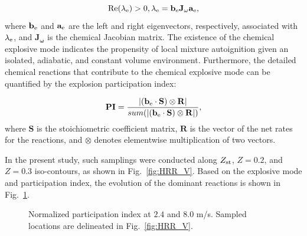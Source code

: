 \documentclass[review,3p,times]{elsarticle}
\begin{document}
\begin{equation}
\rm{Re}(\lambda_{\rm e}) > 0, \lambda_{\rm e} = \mathbf{b_{\rm e}J_{\omega}a_{\rm e}},
\end{equation}
where $\mathbf{b_{\rm e}}$ and $\mathbf{a_{\rm e}}$ are the left and right eigenvectors, respectively, associated with $\lambda_{\rm e}$, and $\mathbf{J_{\omega}}$ is the chemical Jacobian matrix.  The existence of the chemical explosive mode indicates the propensity of local mixture autoignition given an isolated, adiabatic, and constant volume environment.  Furthermore, the detailed chemical reactions that contribute to the chemical explosive mode can be quantified by the explosion participation index:

\begin{equation}
\mathbf{PI} = \frac{|(\mathbf{b_{\rm e}} \cdot \mathbf{S}) \otimes \mathbf{R}|}{sum(|(\mathbf{b_{\rm e}} \cdot \mathbf{S}) \otimes \mathbf{R}|)},
\end{equation}
where $\mathbf{S}$ is the stoichiometric coefficient matrix, $\mathbf{R}$ is the vector of the net rates for the reactions, and $\otimes$ denotes elementwise multiplication of two vectors.  

In the present study, such samplings were conducted along $Z_{\rm st}$, $Z = 0.2$, and $Z = 0.3$ iso-contours, as shown in Fig.~\ref{fig:HRR_V}.  Based on the explosive mode and participation index, the evolution of the dominant reactions is shown in Fig.~\ref{fig:CEMA_V}.

\begin{figure}
  \centering
  \scriptsize
  \resizebox{1.0\textwidth}{!}{}
  \resizebox{1.0\textwidth}{!}{}
  \normalsize
  \caption{Normalized participation index at $2.4$ and $8.0$ m/s.  Sampled locations are delineated in Fig.~\ref{fig:HRR_V}.}
  \label{fig:CEMA_V}
\end{figure}
\end{document}
